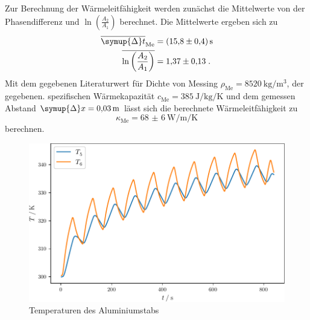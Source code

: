 Zur Berechnung der Wärmeleitfähigkeit werden zunächst die Mittelwerte von der Phasendifferenz und  $\ln \left (  \frac{A_2}{A_1} \right)$ berechnet.
Die Mittelwerte ergeben sich zu
\begin{align}
  \overline{\symup{\Delta} t}_\text{Me}                     &= \SI{15.8(4)}{\second} \\
  \overline{\ln \left (  \frac{A_2}{A_1} \right)} & = \num{1.37(13)} \; \text{.}        
\end{align}
Mit dem gegebenen Literaturwert für Dichte von Messing $\rho_\text{Me} = \SI{8520}{\kilogram\per\meter\cubed}$, der gegebenen. spezifischen Wärmekapazität 
$c_\text{Me} = \SI{385}{\joule\per\kilogram\per\kelvin}$ und dem gemessen Abstand $\symup{\Delta} x = \SI{0.03}{\meter}$ lässt sich die berechnete Wärmeleitfähigkeit zu
\begin{equation}
\kappa_\text{Me} = \SI{68(6)}{\watt\per\metre\per\kelvin}
\end{equation}
berechnen.
\begin{figure}
  \caption{Temperaturen des Aluminiumstabs}
  \centering
  \includegraphics[width = \textwidth]{build/Al.pdf}
\end{figure}
